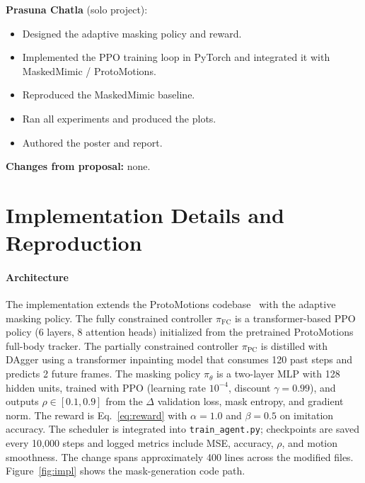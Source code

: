 \documentclass[10pt,letterpaper]{article}
\newcommand{\pfc}{\pi_{\mathrm{FC}}}
\newcommand{\ppc}{\pi_{\mathrm{PC}}}
\newcommand{\pth}{\pi_{\theta}}
\begin{document}
\textbf{Prasuna Chatla} (solo project):
\begin{itemize}
  \item Designed the adaptive masking policy and reward.
  \item Implemented the PPO training loop in PyTorch and integrated it with MaskedMimic / ProtoMotions.
  \item Reproduced the MaskedMimic baseline.
  \item Ran all experiments and produced the plots.
  \item Authored the poster and report.
\end{itemize}

\noindent\textbf{Changes from proposal:} none.




\appendix
\section{Implementation Details and Reproduction}
\label{app:impl}

\paragraph{Architecture}
The implementation extends the ProtoMotions codebase~\cite{protomotions} with the adaptive masking policy. The fully constrained controller $\pfc$ is a transformer-based PPO policy (6 layers, 8 attention heads) initialized from the pretrained ProtoMotions full-body tracker. The partially constrained controller $\ppc$ is distilled with DAgger using a transformer inpainting model that consumes 120 past steps and predicts 2 future frames. The masking policy $\pth$ is a two-layer MLP with 128 hidden units, trained with PPO (learning rate $10^{-4}$, discount $\gamma = 0.99$), and outputs $\rho \in [0.1, 0.9]$ from the $\Delta$ validation loss, mask entropy, and gradient norm. The reward is Eq.~\ref{eq:reward} with $\alpha = 1.0$ and $\beta = 0.5$ on imitation accuracy. The scheduler is integrated into \texttt{train\_agent.py}; checkpoints are saved every 10{,}000 steps and logged metrics include MSE, accuracy, $\rho$, and motion smoothness. The change spans approximately 400 lines across the modified files. Figure~\ref{fig:impl} shows the mask-generation code path.
\end{document}

